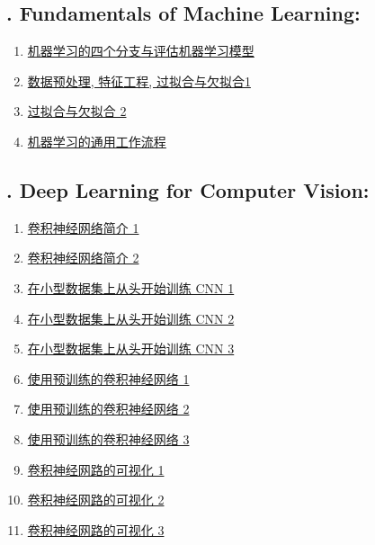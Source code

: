 \documentclass[11pt]{article}
\begin{document}
\subsection*{\small {}. Fundamentals of Machine Learning:}

\vspace{-0.5cm}

\begin{multicols}{2}
	\begin{enumerate}
		\item \href{https://mp.weixin.qq.com/s/0VY5NjzRlcCUHXe_5ZhCwQ}{机器学习的四个分支与评估机器学习模型}	%
		\item \href{https://mp.weixin.qq.com/s/dUfmuRUr-U-pYfSTAESRwg}{数据预处理, 特征工程, 过拟合与欠拟合1}	%
		\item \href{https://mp.weixin.qq.com/s/Pw-Yz2VzSWkE1Wgbn1MbNA}{过拟合与欠拟合 2}	%
		\item \href{https://mp.weixin.qq.com/s/wpEnkMaYOCplcTTyFiqWPw}{机器学习的通用工作流程}	%
	\end{enumerate}
\end{multicols}

\subsection*{\small {}. Deep Learning for Computer Vision:}

\vspace{-0.5cm}

\begin{multicols}{2}
	\begin{enumerate}
		\item \href{https://mp.weixin.qq.com/s/ALoxlmklv_GCQM5iCu6E8Q}{卷积神经网络简介 1}	%
		\item \href{https://mp.weixin.qq.com/s/ldn1zDES0uZdjmCFDVXLjA}{卷积神经网络简介 2}	%
		\item \href{https://mp.weixin.qq.com/s/mbQQVgmCbYPbfBoZYeQpxA}{在小型数据集上从头开始训练 CNN 1}	%
		\item \href{https://mp.weixin.qq.com/s/PhmmQ1cObPjF9s57qJ79DQ}{在小型数据集上从头开始训练 CNN 2}	%
		\item \href{https://mp.weixin.qq.com/s/Y3qM_gj5U52-M42uRrk_yg}{在小型数据集上从头开始训练 CNN 3}	%
		\item \href{https://mp.weixin.qq.com/s/kjzNzFebsa7G57_--ceVug}{使用预训练的卷积神经网络 1}	%
		\item \href{https://mp.weixin.qq.com/s/nolnfH8TzrDzlxPFokKP5g}{使用预训练的卷积神经网络 2}	%
		\item \href{https://mp.weixin.qq.com/s/AhjUD4XzdfSi7W79krEyKQ}{使用预训练的卷积神经网络 3}	%
		\item \href{https://mp.weixin.qq.com/s/kQW0tqPnteTqS7q70cRlJg}{卷积神经网路的可视化 1}	%
		\item \href{https://mp.weixin.qq.com/s/cMK2avvr-cmH6EIhorbrPA}{卷积神经网路的可视化 2}	%
		\item \href{https://mp.weixin.qq.com/s/vTp_OF1myN7SMdi1yBcRSQ}{卷积神经网路的可视化 3}	%
	\end{enumerate}
\end{multicols}
\end{document}
